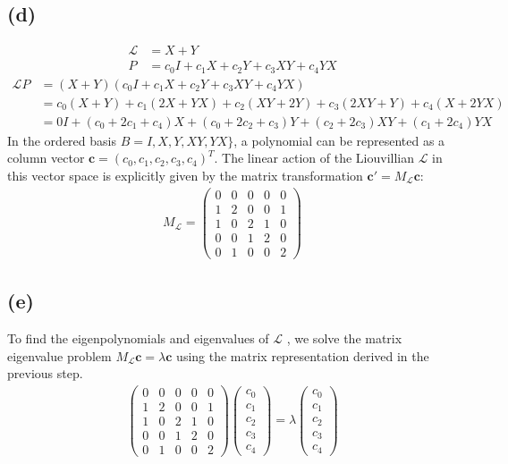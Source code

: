 \documentclass{article}
\begin{document}
\subsection*{(d)}

\begin{align}
    \mathcal{L}&= X+Y\\
    P &= c_0 I + c_1 X + c_2 Y + c_3 XY + c_4 YX
\end{align}
\begin{align}
    \mathcal{L}P&=(X+Y)(c_0 I + c_1 X + c_2 Y + c_3 XY + c_4 YX)\\
    &=c_0(X+Y)+c_1(2X+YX)+c_2(XY+2Y)+c_3(2XY+Y)+c_4(X+2YX)\\
    &=0I+(c_0+2c_1+c_4)X + (c_0+2c_2+c_3)Y+(c_2+2c_3)XY+(c_1+2c_4)YX
\end{align}
In the ordered basis $B = I, X, Y, XY, YX\}$, a polynomial can be represented as a column vector $\mathbf{c} = (c_0, c_1, c_2, c_3, c_4)^T$. The linear action of the Liouvillian $\mathcal{L}$ in this vector space is explicitly given by the matrix transformation $\mathbf{c}' = M_{\mathcal{L}}\mathbf{c}$:
\begin{align}
    M_{\mathcal{L}} = \begin{pmatrix}
0 & 0 & 0 & 0 & 0 \\
1 & 2 & 0 & 0 & 1 \\
1 & 0 & 2 & 1 & 0 \\
0 & 0 & 1 & 2 & 0 \\
0 & 1 & 0 & 0 & 2
\end{pmatrix}
\end{align}

\subsection*{(e)}
To find the eigenpolynomials and eigenvalues of $\mathcal{L}$ , we solve the matrix eigenvalue problem $M_{\mathcal{L}} \mathbf{c} = \lambda \mathbf{c}$ using the matrix representation derived in the previous step.
\begin{align}
    \begin{pmatrix}
0 & 0 & 0 & 0 & 0 \\
1 & 2 & 0 & 0 & 1 \\
1 & 0 & 2 & 1 & 0 \\
0 & 0 & 1 & 2 & 0 \\
0 & 1 & 0 & 0 & 2
\end{pmatrix} \begin{pmatrix} c_0 \\ c_1 \\ c_2 \\ c_3 \\ c_4 \end{pmatrix} = \lambda \begin{pmatrix} c_0 \\ c_1 \\ c_2 \\ c_3 \\ c_4 \end{pmatrix}
\end{align}
\end{document}
